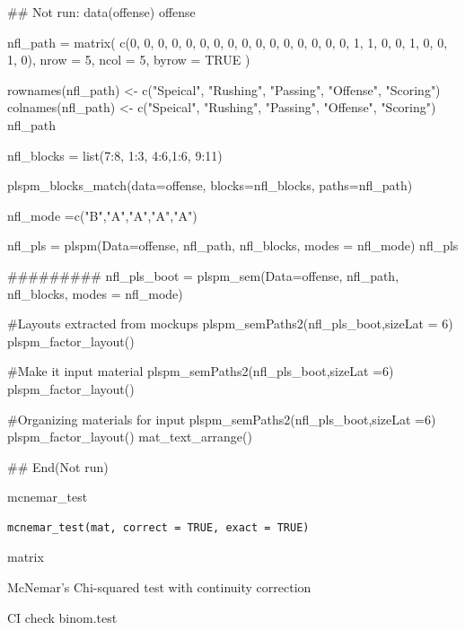 \documentclass[a4paper]{book}
\begin{document}
%
\begin{Examples}
\begin{ExampleCode}
\#\# Not run: 
data(offense)
offense %

nfl_path = matrix(
  c(0, 0, 0, 0, 0,
    0, 0, 0, 0, 0,
    0, 0, 0, 0, 0,
    0, 1, 1, 0, 0,
    1, 0, 0, 1, 0),
  nrow = 5, ncol = 5, byrow = TRUE )

rownames(nfl_path) <- c("Speical", "Rushing", "Passing", "Offense", "Scoring")
colnames(nfl_path) <- c("Speical", "Rushing", "Passing", "Offense", "Scoring")
nfl_path

nfl_blocks = list(7:8, 1:3, 4:6,1:6, 9:11)

plspm_blocks_match(data=offense, blocks=nfl_blocks,
                   paths=nfl_path)

nfl_mode =c("B","A","A","A","A")

nfl_pls = plspm(Data=offense, nfl_path, nfl_blocks, modes = nfl_mode)
nfl_pls%

#########
nfl_pls_boot = plspm_sem(Data=offense, nfl_path, nfl_blocks, modes = nfl_mode)

#Layouts extracted from mockups
plspm_semPaths2(nfl_pls_boot,sizeLat = 6)%
  plspm_factor_layout()

#Make it input material
plspm_semPaths2(nfl_pls_boot,sizeLat =6)%
  plspm_factor_layout() %

#Organizing materials for input
plspm_semPaths2(nfl_pls_boot,sizeLat =6)%
  plspm_factor_layout() %
  mat_text_arrange()

## End(Not run)

\end{ExampleCode}
\end{Examples}
%
\begin{Description}
mcnemar\_test
\end{Description}
%
\begin{Usage}
\begin{verbatim}
mcnemar_test(mat, correct = TRUE, exact = TRUE)
\end{verbatim}
\end{Usage}
%
\begin{Arguments}
\begin{ldescription}
\item[\code{mat}] matrix

\item[\code{correct}] McNemar's Chi-squared test with continuity correction

\item[\code{exact}] CI check binom.test
\end{ldescription}
\end{Arguments}
\end{document}
